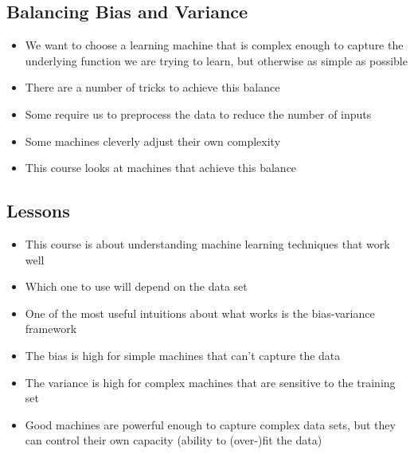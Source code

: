 
\begin{slide}
\section[-1]{Balancing Bias and Variance}

\begin{PauseHighLight}
  \begin{itemize}
  \item We want to choose a learning machine that is complex enough to
    capture the underlying function we are trying to learn, but
    otherwise as simple as possible\pause
  \item There are a number of tricks to achieve this balance\pause
  \item Some require us to preprocess the data to reduce the number of
    inputs\pause
  \item Some machines cleverly adjust their own complexity\pause
  \item This course looks at machines that achieve this balance\pause
  \end{itemize}
\end{PauseHighLight}

\end{slide}


\begin{slide}
\section[-2]{Lessons}

\begin{PauseHighLight}
  \begin{itemize}
  \item This course is about understanding machine learning techniques that
    work well\pause
  \item Which one to use will depend on the data set\pause
  \item One of the most useful intuitions about what works is the
    bias-variance framework\pause
  \item The bias is high for simple machines that can't capture the
    data\pause
  \item The variance is high for complex machines that are sensitive
    to the training set\pause
  \item Good machines are powerful enough to capture complex data sets,
    but they can control their own capacity (ability to (over-)fit the
    data)\pause
  \end{itemize}
\end{PauseHighLight}

\end{slide}


